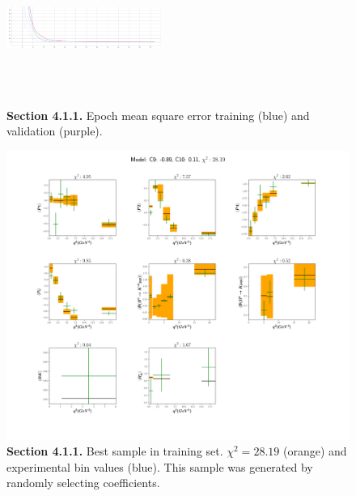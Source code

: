 \documentclass[a4paper,fleqn]{cas-dc}
\begin{document}
\begin{figure}
	\centering
	\includegraphics[width=0.45\textwidth, height=5cm]{images/exp1_epoch_mean_squared_error.pdf}
	\caption{\textbf{Section 4.1.1.} Epoch mean square error training (blue) and validation (purple).}
	\label{FIG:exp1MeanSquareError}
\end{figure}

\begin{figure}
	\includegraphics[width=\textwidth]{images/AllObservables.pdf}
	\caption{\textbf{Section 4.1.1.} Best sample in training set. \(\chi^2 = 28.19\) (orange) and experimental bin values (blue). This sample was generated by randomly selecting coefficients.}
	\label{FIG:NNAll}
\end{figure}
\end{document}
